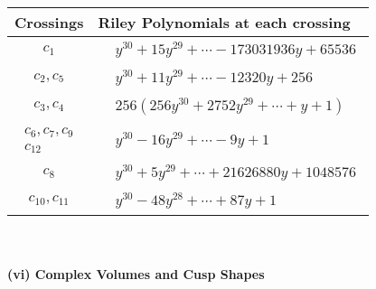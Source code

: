 \documentclass[1p]{elsarticle_modified}
\theoremstyle{definition}
\begin{document}
\begin{tabular}{m{50pt}|m{274pt}}
Crossings & \hspace{64pt}Riley Polynomials at each crossing \\
\hline $$\begin{aligned}c_{1}\end{aligned}$$&$\begin{aligned}
&y^{30}+15 y^{29}+\cdots-173031936 y+65536
\end{aligned}$\\
\hline $$\begin{aligned}c_{2},c_{5}\end{aligned}$$&$\begin{aligned}
&y^{30}+11 y^{29}+\cdots-12320 y+256
\end{aligned}$\\
\hline $$\begin{aligned}c_{3},c_{4}\end{aligned}$$&$\begin{aligned}
&256(256 y^{30}+2752 y^{29}+\cdots+y+1)
\end{aligned}$\\
\hline $$\begin{aligned}c_{6},c_{7},c_{9}\\c_{12}\end{aligned}$$&$\begin{aligned}
&y^{30}-16 y^{29}+\cdots-9 y+1
\end{aligned}$\\
\hline $$\begin{aligned}c_{8}\end{aligned}$$&$\begin{aligned}
&y^{30}+5 y^{29}+\cdots+21626880 y+1048576
\end{aligned}$\\
\hline $$\begin{aligned}c_{10},c_{11}\end{aligned}$$&$\begin{aligned}
&y^{30}-48 y^{28}+\cdots+87 y+1
\end{aligned}$\\
\hline
\end{tabular}\\~\\
\newpage\flushleft \textbf{(vi) Complex Volumes and Cusp Shapes}
\end{document}
